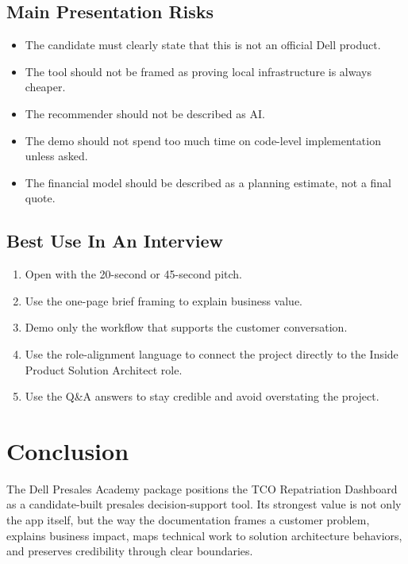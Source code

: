 \documentclass[11pt,a4paper]{article}
\begin{document}
\subsection{Main Presentation Risks}

\begin{itemize}
  \item The candidate must clearly state that this is not an official Dell product.
  \item The tool should not be framed as proving local infrastructure is always cheaper.
  \item The recommender should not be described as AI.
  \item The demo should not spend too much time on code-level implementation unless asked.
  \item The financial model should be described as a planning estimate, not a final quote.
\end{itemize}

\subsection{Best Use In An Interview}

\begin{enumerate}
  \item Open with the 20-second or 45-second pitch.
  \item Use the one-page brief framing to explain business value.
  \item Demo only the workflow that supports the customer conversation.
  \item Use the role-alignment language to connect the project directly to the Inside Product Solution Architect role.
  \item Use the Q\&A answers to stay credible and avoid overstating the project.
\end{enumerate}

\section{Conclusion}

The Dell Presales Academy package positions the TCO Repatriation Dashboard as a candidate-built presales decision-support tool. Its strongest value is not only the app itself, but the way the documentation frames a customer problem, explains business impact, maps technical work to solution architecture behaviors, and preserves credibility through clear boundaries.
\end{document}
